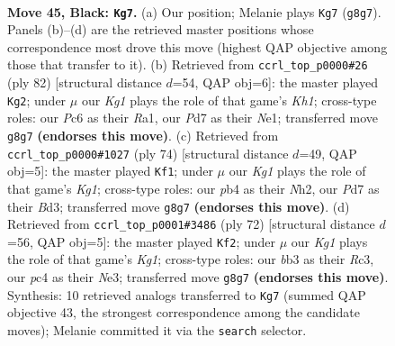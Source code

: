 \documentclass[11pt]{article}
\begin{document}
\clearpage

\begin{figure}[p]\centering
\begin{subfigure}{0.46\textwidth}\centering
\resizebox{\linewidth}{!}{%
\newchessgame
\chessboard[
  setfen={1rb3k1/p2p4/1pp5/5p1p/1PPPnP2/NB6/P3K2P/2R5 b - - 8 45},
  showmover=false,
  pgfstyle=straightmove, color=movearrow, markmove={g8-g7}
]}
\caption{}
\end{subfigure}\hfill
\begin{subfigure}{0.46\textwidth}\centering
\resizebox{\linewidth}{!}{%
\newchessgame
\chessboard[
  setfen={2r2bk1/5p2/4pBpp/3pP3/1n1P1PP1/7P/8/R3N2K w - - 2 42},
  showmover=false,
  pgfstyle=straightmove, color=movearrow, markmove={h1-g2}
]}
\caption{}
\end{subfigure}
\\[4pt]
\begin{subfigure}{0.46\textwidth}\centering
\resizebox{\linewidth}{!}{%
\newchessgame
\chessboard[
  setfen={4b3/7k/4p1p1/ppb1P2p/3pPP2/3B2PP/P6N/6K1 w - - 0 38},
  showmover=false,
  pgfstyle=straightmove, color=movearrow, markmove={g1-f1}
]}
\caption{}
\end{subfigure}\hfill
\begin{subfigure}{0.46\textwidth}\centering
\resizebox{\linewidth}{!}{%
\newchessgame
\chessboard[
  setfen={3n4/6k1/3p2p1/rp1Pp2p/4P2P/P1R1NP2/8/6K1 w - - 2 37},
  showmover=false,
  pgfstyle=straightmove, color=movearrow, markmove={g1-f2}
]}
\caption{}
\end{subfigure}
\caption{\textbf{Move 45, Black: \texttt{Kg7}.} (a) Our position; Melanie plays \texttt{Kg7} (\texttt{g8g7}). Panels (b)--(d) are the retrieved master positions whose correspondence most drove this move (highest QAP objective among those that transfer to it). (b) Retrieved from \texttt{ccrl\_top\_p0000\#26} (ply 82) [structural distance $d$=54, QAP obj=6]: the master played \texttt{Kg2}; under $\mu$ our \emph{Kg1} plays the role of that game's \emph{Kh1}; cross-type roles: our \emph{P}c6 as their \emph{R}a1, our \emph{P}d7 as their \emph{N}e1; transferred move \texttt{g8g7} \textbf{(endorses this move)}. (c) Retrieved from \texttt{ccrl\_top\_p0000\#1027} (ply 74) [structural distance $d$=49, QAP obj=5]: the master played \texttt{Kf1}; under $\mu$ our \emph{Kg1} plays the role of that game's \emph{Kg1}; cross-type roles: our \emph{p}b4 as their \emph{N}h2, our \emph{P}d7 as their \emph{B}d3; transferred move \texttt{g8g7} \textbf{(endorses this move)}. (d) Retrieved from \texttt{ccrl\_top\_p0001\#3486} (ply 72) [structural distance $d$=56, QAP obj=5]: the master played \texttt{Kf2}; under $\mu$ our \emph{Kg1} plays the role of that game's \emph{Kg1}; cross-type roles: our \emph{b}b3 as their \emph{R}c3, our \emph{p}c4 as their \emph{N}e3; transferred move \texttt{g8g7} \textbf{(endorses this move)}. Synthesis: 10 retrieved analogs transferred to \texttt{Kg7} (summed QAP objective 43, the strongest correspondence among the candidate moves); Melanie committed it via the \texttt{search} selector.}
\label{fig:thought-m89}
\end{figure}
\end{document}

